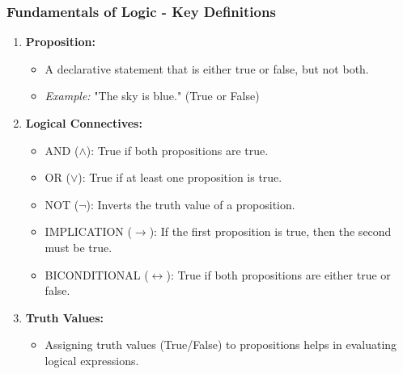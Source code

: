 \documentclass[aspectratio=169]{beamer}
\begin{document}
\begin{frame}[fragile]
    \frametitle{Fundamentals of Logic - Key Definitions}
    \begin{enumerate}
        \item \textbf{Proposition:}
            \begin{itemize}
                \item A declarative statement that is either true or false, but not both.
                \item \textit{Example:} "The sky is blue." (True or False)
            \end{itemize}

        \item \textbf{Logical Connectives:}
            \begin{itemize}
                \item AND (\(\land\)): True if both propositions are true.
                \item OR (\(\lor\)): True if at least one proposition is true.
                \item NOT (\(\neg\)): Inverts the truth value of a proposition.
                \item IMPLICATION (\(\rightarrow\)): If the first proposition is true, then the second must be true.
                \item BICONDITIONAL (\(\leftrightarrow\)): True if both propositions are either true or false.
            \end{itemize}

        \item \textbf{Truth Values:}
            \begin{itemize}
                \item Assigning truth values (True/False) to propositions helps in evaluating logical expressions.
            \end{itemize}
    \end{enumerate}
\end{frame}
\end{document}
